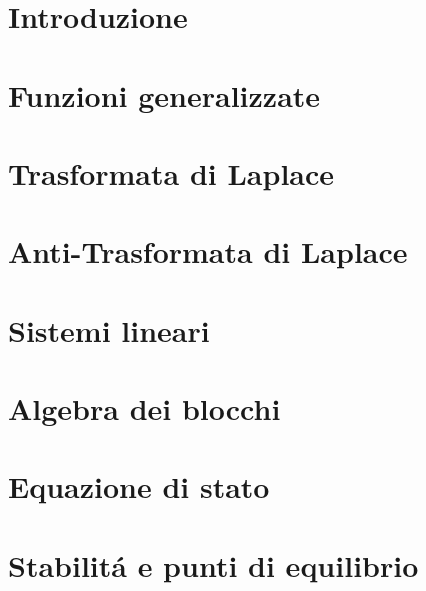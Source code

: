 \documentclass{report}
\begin{document}
	
	
	
	\titleTdS
	\pagebreak
	\pagebreak
	\tableofcontents
	\pagebreak
	\listofexercises
	\pagebreak
		
	\chapter{Introduzione}
		\setcounter{page}{1}
		
	\pagebreak
	\chapter{Funzioni generalizzate}
		\setcounter{page}{1}
	
	\pagebreak
	\chapter{Trasformata di Laplace}
		\setcounter{page}{1}
	
	\pagebreak
	\chapter{Anti-Trasformata di Laplace}
		\setcounter{page}{1}
	
	\pagebreak
	\chapter{Sistemi lineari}
		\setcounter{page}{1}
	
	
	
	
	
	\pagebreak
	\chapter{Algebra dei blocchi}
		\setcounter{page}{1}
	
	
	\pagebreak
	\chapter{Equazione di stato}
		\setcounter{page}{1}
	
	\pagebreak
	\chapter{Stabilit\'a e punti di equilibrio}
		\setcounter{page}{1}
	
	\pagebreak
\end{document}
